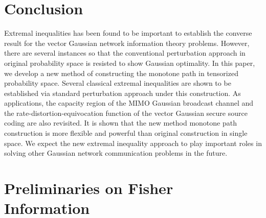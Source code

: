 \documentclass[journal,final, onecolumn]{IEEEtran}
\begin{document}
\section{Conclusion}
Extremal inequalities has been found to be important to establish the converse result for the vector Gaussian network information theory problems. However, there are several instances so that the conventional perturbation approach in original probability space is resisted to show Gaussian optimality. In this paper, we develop a new method of constructing the monotone path in tensorized probability space. Several classical extremal inequalities are shown to be established via standard perturbation approach under this construction. As applications, the capacity region of the MIMO Gaussian broadcast channel and the rate-distortion-equivocation function of the vector Gaussian secure source coding are also revisited. It is shown that the new method monotone path construction is more flexible and powerful than original construction in single space. We expect the new extremal inequality approach to play important roles in solving other Gaussian network communication problems in the future.



%
%

















\appendices

\section{Preliminaries on Fisher Information} \label{app_lea2}
\end{document}
